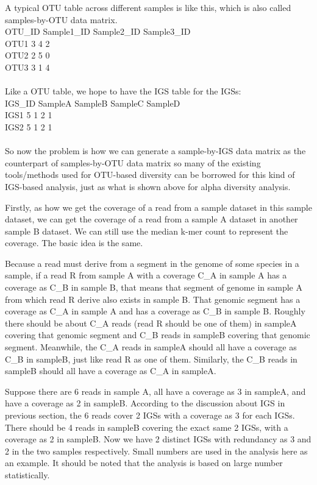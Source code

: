 A typical OTU table across different samples is like this, which is also 
called samples-by-OTU data matrix.
\\
OTU\_ID Sample1\_ID Sample2\_ID Sample3\_ID\\
OTU1   3          4          2\\
OTU2   2          5          0\\
OTU3   3          1          4\\
\\
    
Like a OTU table, we hope to have the IGS table for the IGSs:
\\
    IGS\_ID SampleA SampleB SampleC SampleD\\
    IGS1   5       1       2       1\\
    IGS2   5       1       2       1\\
\\
    
    So now the problem is how we can generate a sample-by-IGS data matrix as 
    the counterpart of samples-by-OTU data matrix so many of  the existing 
    tools/methods used for OTU-based diversity can be borrowed for this kind 
    of IGS-based analysis, just as what is shown above for alpha diversity analysis.

Firstly, as how we get the coverage of a read from a sample dataset in this 
sample dataset, we can get the coverage of a read from a sample A dataset in 
another sample B dataset. We can still use the median k-mer count to represent 
the coverage. The basic idea is the same. 

Because a read must derive from a segment in the genome of some species in a 
sample, if a read R from sample A with a coverage C\_A in sample A has a 
coverage as C\_B in sample B, that means that segment of genome in sample A 
from which read R derive also exists in sample B. That genomic segment has 
a coverage as C\_A in sample A and has a coverage as C\_B in sample B. 
Roughly there should be about C\_A reads (read R should be one of them) 
in sampleA covering that genomic segment and C\_B reads in sampleB covering 
that genomic segment. Meanwhile, the C\_A reads in sampleA should all have 
a coverage as C\_B in sampleB, just like read R as one of them. Similarly,
the C\_B reads in sampleB should all have a coverage as C\_A in sampleA.

Suppose there are 6 reads in sample A, all have a coverage as 3 in sampleA, 
and have a coverage as 2 in sampleB. According to the discussion about IGS in previous section, the 6 reads cover 
2 IGSs with a coverage as 3 for each IGSs. There should be 4 reads in sampleB 
covering the exact same 2 IGSs, with a coverage as 2 in sampleB.
Now we have 2 distinct IGSs with redundancy as 3 and 2 in the two samples 
respectively. Small numbers are used in the analysis here as an example. It should
be noted that the analysis is based on large number statistically.

